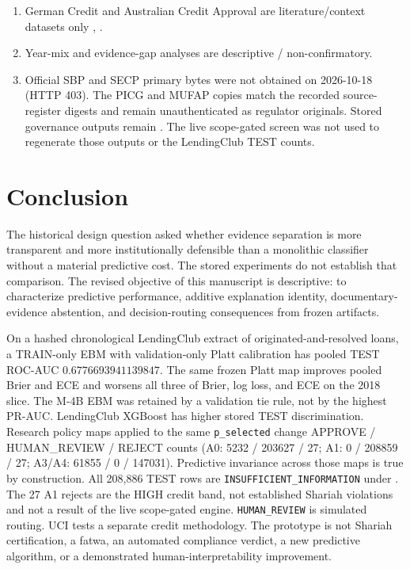 \documentclass{ieeeaccess}
\makeatletter
\DeclareRobustCommand{\sha}[1]{{\ttfamily\expandafter\@shaloop\detokenize{#1}\relax}}
\def\@shaloop#1{%
  \ifx\relax#1\else#1\allowbreak\expandafter\@shaloop\fi}
\makeatother
\begin{document}
\begin{enumerate}
\item German Credit and Australian Credit Approval are literature/context datasets only \cite{b22}, \cite{b23}.
\item Year-mix and evidence-gap analyses are descriptive / non-confirmatory.
\item Official SBP and SECP primary bytes were not obtained on 2026-10-18 (HTTP 403). The PICG and MUFAP copies match the recorded source-register digests and remain unauthenticated as regulator originals. Stored governance outputs remain \sha{stage7-shariah-engine-v1}. The live scope-gated screen was not used to regenerate those outputs or the LendingClub TEST counts.


\end{enumerate}
\section{Conclusion}

The historical design question asked whether evidence separation is more transparent and more institutionally defensible than a monolithic classifier without a material predictive cost. The stored experiments do not establish that comparison. The revised objective of this manuscript is descriptive: to characterize predictive performance, additive explanation identity, documentary-evidence abstention, and decision-routing consequences from frozen artifacts.

On a hashed chronological LendingClub extract of originated-and-resolved loans, a TRAIN-only EBM with validation-only Platt calibration has pooled TEST ROC-AUC \(0.6776693941139847\). The same frozen Platt map improves pooled Brier and ECE and worsens all three of Brier, log loss, and ECE on the 2018 slice. The M-4B EBM was retained by a validation tie rule, not by the highest PR-AUC. LendingClub XGBoost has higher stored TEST discrimination. Research policy maps applied to the same \texttt{p\_selected} change APPROVE / HUMAN\_REVIEW / REJECT counts (A0: 5232 / 203627 / 27; A1: 0 / 208859 / 27; A3/A4: 61855 / 0 / 147031). Predictive invariance across those maps is true by construction. All 208,886 TEST rows are \texttt{INSUFFICIENT\_INFORMATION} under \sha{stage7-shariah-engine-v1}. The 27 A1 rejects are the HIGH credit band, not established Shariah violations and not a result of the live scope-gated engine. \texttt{HUMAN\_REVIEW} is simulated routing. UCI tests a separate credit methodology. The prototype is not Shariah certification, a fatwa, an automated compliance verdict, a new predictive algorithm, or a demonstrated human-interpretability improvement.
\end{document}
